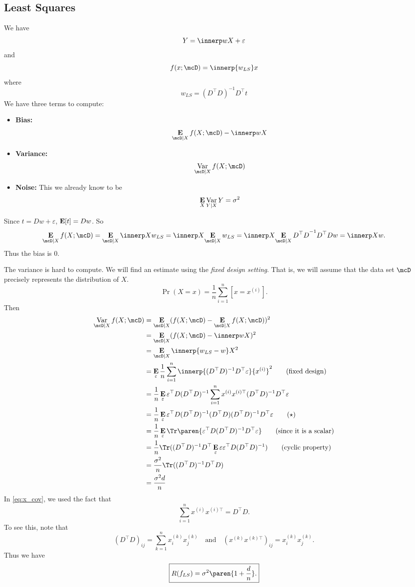 \subsection{Least Squares} \label{sec:generalization:ls}
We have \[
    Y = \innerp w X + \varepsilon
\] and \[
    f(x; \mcD) = \innerp{w_{LS}} x
\] where \[
    w_{LS} = (D^\top D)^{-1} D^\top t
\] We have three terms to compute:
\begin{itemize}
    \item \textbf{Bias:} \[
        \E_{\mcD \given X} f(X; \mcD) - \innerp w X
    \]
    \item \textbf{Variance:} \[
        \Var_{\mcD \given X} f(X; \mcD)
    \]
    \item \textbf{Noise:} This we already know to be \[
        \operatorname*{\textbf{E}}_X \operatorname*{Var}_{Y \mid X} Y = \sigma^2
    \]
\end{itemize}
Since $t = D w + \varepsilon$, $\operatorname*{\textbf{E}}[t] = D w$.
So \[
    \E_{\mcD \given X} f(X; \mcD)
        = \E_{\mcD \given X} \innerp X {w_{LS}}
        = \innerp X {\E_{\mcD \given X} w_{LS}}
        = \innerp X {\E_{\mcD \mid X} {D^\top D}^{-1} D^\top D w}
        = \innerp X w.
\] Thus the bias is $0$.

The variance is hard to compute.
We will find an estimate using the \emph{fixed design setting}.
That is, we will assume that the data set $\mcD$ precisely represents the
distribution of $X$. \[
    \Pr(X = x) = \frac1n \sum_{i=1}^n [x = x^{(i)}].
\] Then \begin{align*}
    \Var_{\mcD \given X} f(X; \mcD)
    &= \E_{\mcD \given X} (f(X; \mcD) - \E_{\mcD \given X} f(X; \mcD))^2 \\
    &= \E_{\mcD \given X} (f(X; \mcD) - \innerp w X)^2 \\
    &= \E_{\mcD \given X} \innerp{w_{LS} - w} X^2 \\
    &= \E_\varepsilon \frac1n \sum_{i=1}^n \innerp{(D^\top D)^{-1} D^\top \varepsilon}
            {x^{(i)}}^2 \tag{fixed design} \\
    &= \frac1n \E_\varepsilon \varepsilon^\top D (D^\top D)^{-1} \sum_{i=1}^n x^{(i)} x^{(i)\top} (D^\top D)^{-1} D^\top \varepsilon \\
    &= \frac1n \E_\varepsilon \varepsilon^\top D (D^\top D)^{-1} (D^\top D) (D^\top D)^{-1} D^\top \varepsilon \tag{$\star$} \label{eq:x_cov} \\
    &= \frac1n \E_\varepsilon  \Tr\paren{\varepsilon^\top D (D^\top D)^{-1} D^\top \varepsilon}
        \tag{since it is a scalar} \\
    &= \frac1n \Tr((D^\top D)^{-1} D^\top \E_\varepsilon \varepsilon
            \varepsilon^\top D (D^\top D)^{-1}) \tag{cyclic property} \\
    &= \frac{\sigma^2}n \Tr((D^\top D)^{-1} D^\top D) \\
    &= \frac{\sigma^2 d}n
\end{align*}
In \cref{eq:x_cov}, we used the fact that \[
    \sum_{i=1}^n x^{(i)} x^{(i)\top} = D^\top D.
\] To see this, note that \[
    (D^\top D)_{ij} = \sum_{k=1}^n x^{(k)}_i x^{(k)}_j
    \quad\text{and}\quad
    (x^{(k)} x^{(k)\top})_{ij} = x^{(k)}_i x^{(k)}_j.
\]
Thus we have \[
    \boxed{R(f_{LS}) = \sigma^2 \paren{1 + \frac dn}.}
\]
